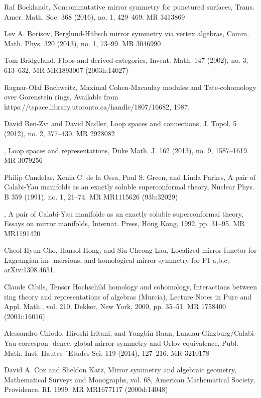 {\begin{list}{}{%
  \setlength{\leftmargin}{3.4em}%
  \setlength{\itemindent}{-3.4em}%
  \setlength{\itemsep}{1.5pt}%
  \setlength{\parsep}{0pt}%
  \setlength{\listparindent}{0pt}%
}
\item[{[Boc16]}] Raf Bocklandt, Noncommutative mirror symmetry for punctured surfaces, Trans. Amer. Math. Soc. 368 (2016), no. 1, 429--469. MR 3413869
\item[{[Bor13]}] Lev A. Borisov, Berglund-Hübsch mirror symmetry via vertex algebras, Comm. Math. Phys. 320 (2013), no. 1, 73--99. MR 3046990
\item[{[Bri02]}] Tom Bridgeland, Flops and derived categories, Invent. Math. 147 (2002), no. 3, 613--632. MR MR1893007 (2003h:14027)
\item[{[Buc87]}] Ragnar-Olaf Buchweitz, Maximal Cohen-Macaulay modules and Tate-cohomology over Gorenstein rings, Available from https://tspace.library.utoronto.ca/handle/1807/16682, 1987.
\item[{[BZN12]}] David Ben-Zvi and David Nadler, Loop spaces and connections, J. Topol. 5 (2012), no. 2, 377--430. MR 2928082
\item[{[BZN13]}] , Loop spaces and representations, Duke Math. J. 162 (2013), no. 9, 1587--1619. MR 3079256
\item[{[CdlOGP91]}] Philip Candelas, Xenia C. de la Ossa, Paul S. Green, and Linda Parkes, A pair of Calabi-Yau manifolds as an exactly soluble superconformal theory, Nuclear Phys. B 359 (1991), no. 1, 21--74. MR MR1115626 (93b:32029)
\item[{[CdlOGP92]}] , A pair of Calabi-Yau manifolds as an exactly soluble superconformal theory, Essays on mirror manifolds, Internat. Press, Hong Kong, 1992, pp. 31--95. MR MR1191420
\item[{[CHL]}] Cheol-Hyun Cho, Hansol Hong, and Siu-Cheong Lau, Localized mirror functor for Lagrangian im- mersions, and homological mirror symmetry for P1 a,b,c, arXiv:1308.4651.
\item[{[Cib00]}] Claude Cibils, Tensor Hochschild homology and cohomology, Interactions between ring theory and representations of algebras (Murcia), Lecture Notes in Pure and Appl. Math., vol. 210, Dekker, New York, 2000, pp. 35--51. MR 1758400 (2001i:16016)
\item[{[CIR14]}] Alessandro Chiodo, Hiroshi Iritani, and Yongbin Ruan, Landau-Ginzburg/Calabi-Yau correspon- dence, global mirror symmetry and Orlov equivalence, Publ. Math. Inst. Hautes ´Etudes Sci. 119 (2014), 127--216. MR 3210178
\item[{[CK99]}] David A. Cox and Sheldon Katz, Mirror symmetry and algebraic geometry, Mathematical Surveys and Monographs, vol. 68, American Mathematical Society, Providence, RI, 1999. MR MR1677117 (2000d:14048)

\end{list}}
